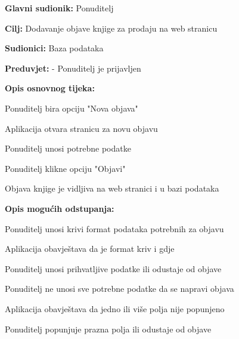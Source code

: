                     \noindent {}
					\begin{packed_item}
	
						\item \textbf{Glavni sudionik: } Ponuditelj
						\item  \textbf{Cilj:} Dodavanje objave knjige za prodaju na web stranicu
						\item  \textbf{Sudionici:} Baza podataka
						\item  \textbf{Preduvjet:} - Ponuditelj je prijavljen
						\item  \textbf{Opis osnovnog tijeka:}
						
						\item[] \begin{packed_enum}
	
							\item Ponuditelj bira opciju "Nova objava"
                            					\item Aplikacija otvara stranicu za novu objavu
                            					\item Ponuditelj unosi potrebne podatke
							\item Ponuditelj klikne opciju "Objavi"
                            					\item Objava knjige je vidljiva na web stranici i u bazi podataka
						\end{packed_enum}
						
						\item  \textbf{Opis mogućih odstupanja:}
						
						\item[] \begin{packed_item}
	
							\item[2.a] Ponuditelj unosi krivi format podataka potrebnih za objavu
							\item[] \begin{packed_enum}
								
								\item Aplikacija obavještava da je format kriv i gdje
								\item Ponuditelj unosi prihvatljive podatke ili odustaje od objave
							\end{packed_enum}
                            					\item[2.b] Ponuditelj ne unosi sve potrebne podatke da se napravi objava
                             					\item[] \begin{packed_enum}
                                 					\item Aplikacija obavještava da jedno ili više polja nije popunjeno
                                 					\item Ponuditelj popunjuje prazna polja ili odustaje od objave
                             					\end{packed_enum}
						\end{packed_item}
					\end{packed_item}

